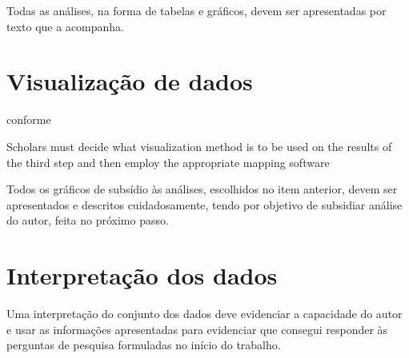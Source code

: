 Todas as análises, na forma de tabelas e gráficos, devem ser apresentadas por texto que a acompanha.

\section{Visualização de dados}

conforme \cite{aria_bibliometrix_2017}
\begin{itquote}
Scholars must decide what visualization method is to be used on the results of the
third step and then employ the appropriate mapping software    
\end{itquote}

Todos os gráficos de subsídio às análises, escolhidos no item anterior,  devem ser apresentados e descritos cuidadosamente, tendo por objetivo de subsidiar  análise do autor, feita no próximo passo. 

\section{Interpretação dos dados}

Uma interpretação do conjunto dos dados deve evidenciar a capacidade do autor e usar as informações apresentadas para evidenciar que consegui responder às perguntas de pesquisa formuladas no início do trabalho.


